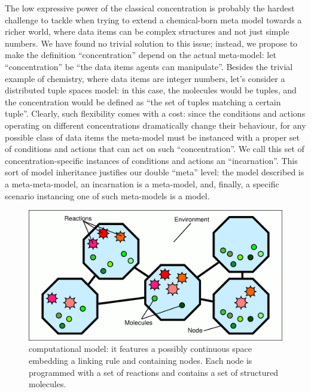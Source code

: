 \documentclass[12pt,a4paper,twoside,openright]{book}
\begin{document}
The low expressive power of the classical concentration is probably the hardest challenge to tackle when trying to extend a chemical-born meta model towards a richer world, where data items can be complex structures and not just simple numbers.
%
We have found no trivial solution to this issue; instead, we propose to make the definition ``concentration'' depend on the actual meta-model: let ``concentration'' be ``the data items agents can manipulate''.
%
Besides the trivial example of chemistry, where data items are integer numbers, let's consider a distributed tuple spaces model: in this case, the molecules would be tuples, and the concentration would be defined as ``the set of tuples matching a certain tuple''.
%
Clearly, such flexibility comes with a cost: since the conditions and actions operating on different concentrations dramatically change their behaviour, for any possible class of data items the meta-model must be instanced with a proper set of conditions and actions that can act on such ``concentration''.
%
We call this set of concentration-specific instances of conditions and actions an ``incarnation''.
%
This sort of model inheritance justifies our double ``meta'' level: the model described is a meta-meta-model, an incarnation is a meta-model, and, finally, a specific scenario instancing one of such meta-models is a model.

\label{model}
\begin{figure}%
  \begin{center}
    \includegraphics[width=0.99\columnwidth]{img/model.pdf}
    \caption[\alchemist{} computational model]{\alchemist{} computational model: it features a possibly continuous space embedding a linking rule and containing nodes. Each node is programmed with a set of reactions and contains a set of structured molecules.}
    \label{img:model}
  \end{center}
\end{figure}
\end{document}
